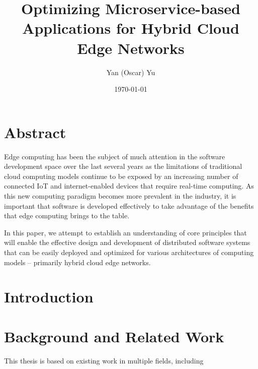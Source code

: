 \documentclass[11pt]{article}
\title{Optimizing Microservice-based Applications for Hybrid Cloud Edge Networks}
\author{Yan (Oscar) Yu}
\date{\today}
\begin{document}


\section*{Abstract}

Edge computing has been the subject of much attention in the software development space over the 
last several years as the limitations of traditional cloud computing models continue to be exposed 
by an increasing number of connected IoT and internet-enabled devices that require real-time 
computing. As this new computing paradigm becomes more prevalent in the industry, it is important 
that software is developed effectively to take advantage of the benefits that edge computing 
brings to the table.
\newline

In this paper, we attempt to establish an understanding of core principles that will enable the 
effective design and development of distributed software systems that can be easily deployed and 
optimized for various architectures of computing models -- primarily hybrid cloud edge networks.
\newline


\newpage
\tableofcontents

\newpage
\section{Introduction}

\newpage
\section{Background and Related Work}
This thesis is based on existing work in multiple fields, including 
\end{document}
